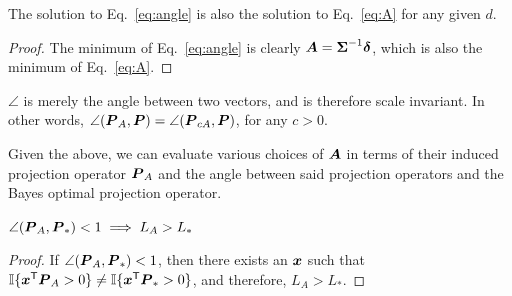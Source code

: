 \documentclass[10pt]{article}
\begin{document}
\begin{lem} \label{l:angle}
The solution to Eq.~\eqref{eq:angle} is also the solution to Eq.~\eqref{eq:A} for any given $d$.
\end{lem}

\begin{proof}
The minimum of Eq.~\eqref{eq:angle} is clearly $\boldsymbol{A}=\boldsymbol{\Sigma}^{-1} \boldsymbol{\delta}$, which is also the minimum of Eq.~\eqref{eq:A}.
\end{proof}


\begin{remark}
$\angle$ is merely the angle between two vectors, and is therefore scale invariant.  In other words, $\angle(\boldsymbol{P}_A,\boldsymbol{P})=\angle(\boldsymbol{P}_{c A},\boldsymbol{P})$, for any $c > 0$.
\end{remark}

Given the above, we can evaluate various choices of $\boldsymbol{A}$ in terms of their induced projection operator $\boldsymbol{P}_A$ and the angle between said projection operators and the Bayes optimal projection operator.


\begin{lem}
$\angle(\boldsymbol{P}_A, \boldsymbol{P}_*) <1  \implies L_A > L_*$
\end{lem}


\begin{proof}
If $\angle(\boldsymbol{P}_A, \boldsymbol{P}_*) <1$, then there exists an $\boldsymbol{x}$ such that $\mathbb{I}\{ \boldsymbol{x}^{\mathsf{T}} \boldsymbol{P}_A >0 \} \neq \mathbb{I}\{ \boldsymbol{x}^{\mathsf{T}} \boldsymbol{P}_* >0 \}$, and therefore, $L_A > L_*$.
\end{proof}
\end{document}
